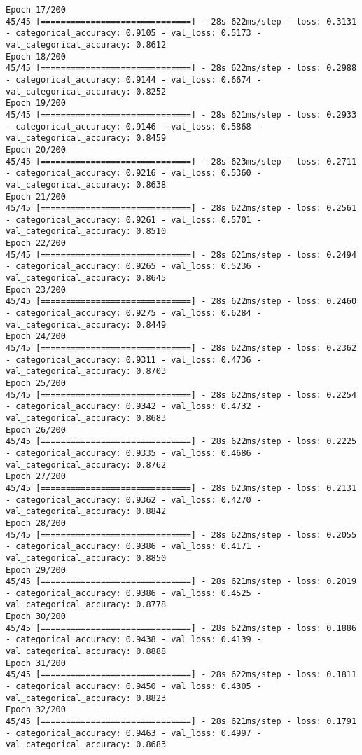 \begin{lstlisting}
Epoch 17/200
45/45 [==============================] - 28s 622ms/step - loss: 0.3131 - categorical_accuracy: 0.9105 - val_loss: 0.5173 - val_categorical_accuracy: 0.8612
Epoch 18/200
45/45 [==============================] - 28s 622ms/step - loss: 0.2988 - categorical_accuracy: 0.9144 - val_loss: 0.6674 - val_categorical_accuracy: 0.8252
Epoch 19/200
45/45 [==============================] - 28s 621ms/step - loss: 0.2933 - categorical_accuracy: 0.9146 - val_loss: 0.5868 - val_categorical_accuracy: 0.8459
Epoch 20/200
45/45 [==============================] - 28s 623ms/step - loss: 0.2711 - categorical_accuracy: 0.9216 - val_loss: 0.5360 - val_categorical_accuracy: 0.8638
Epoch 21/200
45/45 [==============================] - 28s 622ms/step - loss: 0.2561 - categorical_accuracy: 0.9261 - val_loss: 0.5701 - val_categorical_accuracy: 0.8510
Epoch 22/200
45/45 [==============================] - 28s 621ms/step - loss: 0.2494 - categorical_accuracy: 0.9265 - val_loss: 0.5236 - val_categorical_accuracy: 0.8645
Epoch 23/200
45/45 [==============================] - 28s 622ms/step - loss: 0.2460 - categorical_accuracy: 0.9275 - val_loss: 0.6284 - val_categorical_accuracy: 0.8449
Epoch 24/200
45/45 [==============================] - 28s 622ms/step - loss: 0.2362 - categorical_accuracy: 0.9311 - val_loss: 0.4736 - val_categorical_accuracy: 0.8703
Epoch 25/200
45/45 [==============================] - 28s 622ms/step - loss: 0.2254 - categorical_accuracy: 0.9342 - val_loss: 0.4732 - val_categorical_accuracy: 0.8683
Epoch 26/200
45/45 [==============================] - 28s 622ms/step - loss: 0.2225 - categorical_accuracy: 0.9335 - val_loss: 0.4686 - val_categorical_accuracy: 0.8762
Epoch 27/200
45/45 [==============================] - 28s 623ms/step - loss: 0.2131 - categorical_accuracy: 0.9362 - val_loss: 0.4270 - val_categorical_accuracy: 0.8842
Epoch 28/200
45/45 [==============================] - 28s 622ms/step - loss: 0.2055 - categorical_accuracy: 0.9386 - val_loss: 0.4171 - val_categorical_accuracy: 0.8850
Epoch 29/200
45/45 [==============================] - 28s 621ms/step - loss: 0.2019 - categorical_accuracy: 0.9386 - val_loss: 0.4525 - val_categorical_accuracy: 0.8778
Epoch 30/200
45/45 [==============================] - 28s 622ms/step - loss: 0.1886 - categorical_accuracy: 0.9438 - val_loss: 0.4139 - val_categorical_accuracy: 0.8888
Epoch 31/200
45/45 [==============================] - 28s 622ms/step - loss: 0.1811 - categorical_accuracy: 0.9450 - val_loss: 0.4305 - val_categorical_accuracy: 0.8823
Epoch 32/200
45/45 [==============================] - 28s 621ms/step - loss: 0.1791 - categorical_accuracy: 0.9463 - val_loss: 0.4997 - val_categorical_accuracy: 0.8683

\end{lstlisting}
